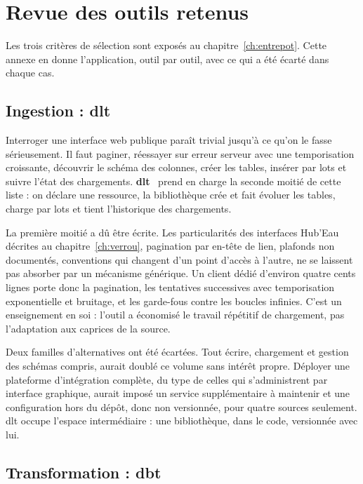 \chapter{Revue des outils retenus}
\label{ann:outils}

Les trois critères de sélection sont exposés au chapitre~\ref{ch:entrepot}. Cette annexe en
donne l'application, outil par outil, avec ce qui a été écarté dans chaque cas.

\section{Ingestion : dlt}

Interroger une interface web publique paraît trivial jusqu'à ce qu'on le fasse sérieusement. Il
faut paginer, réessayer sur erreur serveur avec une temporisation croissante, découvrir le schéma
des colonnes, créer les tables, insérer par lots et suivre l'état des chargements.
\textbf{dlt}~\cite{dlt} prend en charge la seconde moitié de cette liste : on déclare une
ressource, la bibliothèque crée et fait évoluer les tables, charge par lots et tient l'historique
des chargements.

La première moitié a dû être écrite. Les particularités des interfaces Hub'Eau décrites au
chapitre~\ref{ch:verrou}, pagination par en-tête de lien, plafonds non documentés, conventions
qui changent d'un point d'accès à l'autre, ne se laissent pas absorber par un mécanisme
générique. Un client dédié d'environ quatre cents lignes porte donc la pagination, les tentatives
successives avec temporisation exponentielle et bruitage, et les garde-fous contre les boucles
infinies. C'est un enseignement en soi : l'outil a économisé le travail répétitif de chargement,
pas l'adaptation aux caprices de la source.

Deux familles d'alternatives ont été écartées. Tout écrire, chargement et gestion des schémas
compris, aurait doublé ce volume sans intérêt propre. Déployer une plateforme d'intégration
complète, du type de celles qui s'administrent par interface graphique, aurait imposé un service
supplémentaire à maintenir et une configuration hors du dépôt, donc non versionnée, pour quatre
sources seulement. dlt occupe l'espace intermédiaire : une bibliothèque, dans le code, versionnée
avec lui.

\section{Transformation : dbt}

